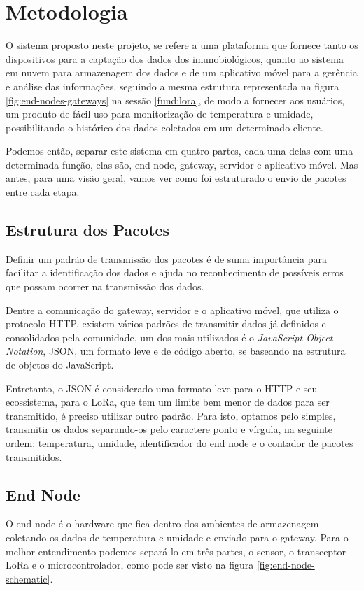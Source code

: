 \chapter{Metodologia}
\label{cap:metodologia}
O sistema proposto neste projeto, se refere a uma plataforma que fornece tanto os dispositivos para a captação dos dados dos imunobiológicos, quanto ao sistema em nuvem para armazenagem dos dados e de um aplicativo móvel para a gerência e análise das informações, seguindo a mesma estrutura representada na figura \ref{fig:end-nodes-gateways} na sessão \ref{fund:lora}, de modo a fornecer aos usuários, um produto  de fácil uso para monitorização de temperatura e umidade, possibilitando o histórico dos dados coletados em um determinado cliente.

Podemos então, separar este sistema em quatro partes, cada uma delas com uma determinada função, elas são, end-node, gateway, servidor e aplicativo móvel. Mas antes, para uma visão geral, vamos ver como foi estruturado o envio de pacotes entre cada etapa.

\section{Estrutura dos Pacotes}
\label{metod:pacotes}
Definir um padrão de transmissão dos pacotes é de suma importância para facilitar a identificação dos dados e ajuda no reconhecimento de possíveis erros que possam ocorrer na transmissão dos dados.

Dentre a comunicação do gateway, servidor e o aplicativo móvel, que utiliza o protocolo HTTP, existem vários padrões de transmitir dados já definidos e consolidados pela comunidade,  um dos mais utilizados é o \textit{JavaScript Object Notation}, JSON, um formato leve e de código aberto, se baseando na estrutura de objetos do JavaScript.

Entretanto, o JSON é considerado uma formato leve para o HTTP e seu ecossistema, para o LoRa, que tem um limite bem menor de dados para ser transmitido, é preciso utilizar outro padrão. Para isto, optamos pelo simples, transmitir os dados separando-os pelo caractere ponto e vírgula, na seguinte ordem: temperatura, umidade, identificador do end node e o contador de pacotes transmitidos.

\section{End Node}
\label{metod:node}
O end node é o hardware que fica dentro dos ambientes de armazenagem coletando os dados de temperatura e umidade e enviado para o gateway. Para o melhor entendimento podemos separá-lo em três partes, o sensor, o transceptor LoRa e o microcontrolador, como pode ser visto na figura \ref{fig:end-node-schematic}.


